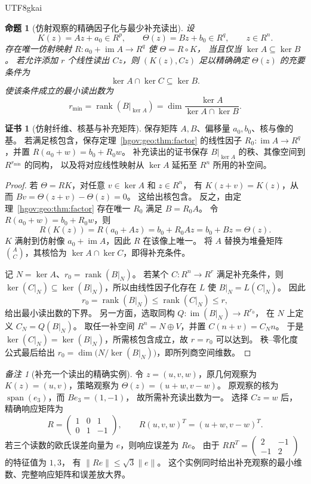 \documentclass[12pt,a4paper,openany,notitlepage]{report}
\theoremstyle{plain}
\newtheorem{proposition}[theorem]{命题}
\theoremstyle{definition}
\newtheorem*{certificate}{证书}
\theoremstyle{remark}
\newtheorem{remark}[theorem]{备注}
\def\mathcal#1{#1}\def\mathsf#1{#1}\def\mathbb#1{#1}%
\begin{document}
\begin{CJK*}{UTF8}{gkai}
\begin{proposition}[仿射观察的精确因子化与最少补充读出]
\label{exp:geo:prop:affine-factorization}
设
\[
\mathcal K(z)=Az+a_0\in\mathbb R^p,
\qquad
\Theta(z)=Bz+b_0\in\mathbb R^q,
\qquad z\in\mathbb R^n.
\]
存在唯一仿射映射
$R:a_0+\operatorname{im}A\to\mathbb R^q$ 使 $\Theta=R\circ\mathcal K$，
当且仅当 $\ker A\subseteq\ker B$。
若允许添加 $r$ 个线性读出 $Cz$，则
$(\mathcal K(z),Cz)$ 足以精确确定 $\Theta(z)$ 的充要条件为
\[
\ker A\cap\ker C\subseteq\ker B.
\]
使该条件成立的最小读出数为
\[
r_{\min}=\operatorname{rank}(B|_{\ker A})
=\dim\frac{\ker A}{\ker A\cap\ker B}.
\]
\end{proposition}
\begin{certificate}[仿射纤维、核基与补充矩阵]
保存矩阵 $A,B$、偏移量 $a_0,b_0$、核与像的基。
若满足核包含，保存定理~\ref{hgov:geo:thm:factor} 的线性因子
$R_0:\operatorname{im}A\to\mathbb R^q$，并置
$R(a_0+w)=b_0+R_0w$。
补充读出的证书保存 $B|_{\ker A}$ 的秩、其像空间到 $\mathbb R^{r_{\min}}$ 的同构，
以及将对应线性映射从 $\ker A$ 延拓至 $\mathbb R^n$ 所用的补空间。
\end{certificate}
\begin{proof}
若 $\Theta=R\mathcal K$，对任意 $v\in\ker A$ 和 $z\in\mathbb R^n$，
有 $\mathcal K(z+v)=\mathcal K(z)$，从而
$Bv=\Theta(z+v)-\Theta(z)=0$。
这给出核包含。
反之，由定理~\ref{hgov:geo:thm:factor} 存在唯一 $R_0$ 满足 $B=R_0A$。
令 $R(a_0+w)=b_0+R_0w$，则
\[
R(\mathcal K(z))=R(a_0+Az)=b_0+R_0Az=b_0+Bz=\Theta(z).
\]
$\mathcal K$ 满射到仿射像 $a_0+\operatorname{im}A$，因此 $R$ 在该像上唯一。
将 $A$ 替换为堆叠矩阵 $\binom AC$，其核恰为 $\ker A\cap\ker C$，即得补充条件。

记 $N=\ker A$、$r_0=\operatorname{rank}(B|_N)$。
若某个 $C:\mathbb R^n\to\mathbb R^r$ 满足补充条件，则
$\ker(C|_N)\subseteq\ker(B|_N)$，所以由线性因子化存在 $L$ 使
$B|_N=L(C|_N)$。
因此
\[
r_0=\operatorname{rank}(B|_N)
\le\operatorname{rank}(C|_N)\le r,
\]
给出最小读出数的下界。
另一方面，选取同构
$Q:\operatorname{im}(B|_N)\to\mathbb R^{r_0}$，
在 $N$ 上定义 $C_N=Q(B|_N)$。
取任一补空间 $\mathbb R^n=N\oplus V$，并置 $C(n+v)=C_Nn$。
于是 $\ker(C|_N)=\ker(B|_N)$，所需核包含成立，故 $r=r_0$ 可以达到。
秩--零化度公式最后给出
$r_0=\dim\bigl(N/\ker(B|_N)\bigr)$，即所列商空间维数。
\end{proof}

\begin{remark}[补充一个读出的精确实例]
令 $z=(u,v,w)$，原几何观察为 $\mathcal K(z)=(u,v)$，策略观察为
$\Theta(z)=(u+w,v-w)$。
原观察的核为 $\operatorname{span}(e_3)$，而 $Be_3=(1,-1)$，
故所需补充读出数为一。
选择 $Cz=w$ 后，精确响应矩阵为
\[
R=\begin{pmatrix}1&0&1\\0&1&-1\end{pmatrix},
\qquad R(u,v,w)^{\mathsf T}=(u+w,v-w)^{\mathsf T}.
\]
若三个读数的欧氏误差向量为 $e$，则响应误差为 $Re$。
由于
$RR^{\mathsf T}=\begin{pmatrix}2&-1\\-1&2\end{pmatrix}$ 的特征值为 $1,3$，
有 $\lVert Re\rVert\le\sqrt3\lVert e\rVert$。
这个实例同时给出补充观察的最小维数、完整响应矩阵和误差放大界。
\end{remark}


\end{CJK*}
\end{document}
